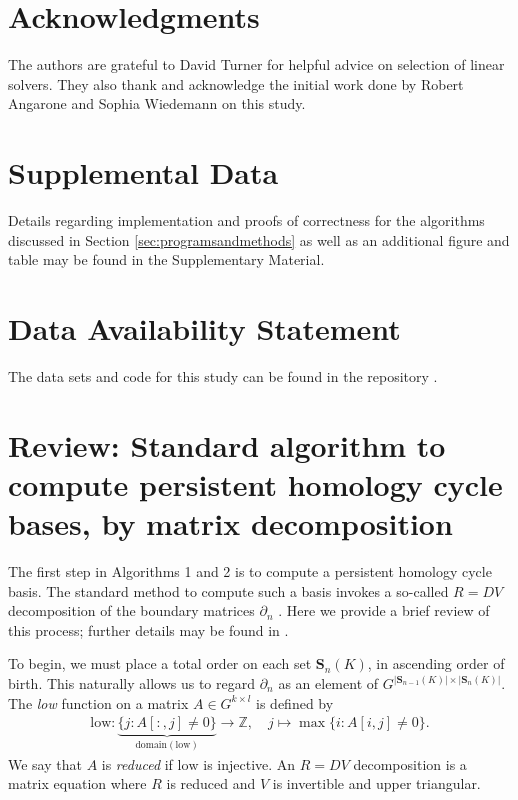\documentclass[11pt,onecolumn]{article}
\newcommand{\Z}{\mathbb{Z}}
\newcommand{\Simplices}[0]{\mathbf{S}}
\newcommand{\se}{Section }
\theoremstyle{plain}
\theoremstyle{definition}
\newcommand{\low}{\mathrm{low}}
\begin{document}
\section{Acknowledgments} 
The authors are grateful to David Turner for helpful advice on selection of linear solvers. They also thank and acknowledge the initial work done by Robert Angarone and Sophia Wiedemann on this study.

 
 \section{Supplemental Data}

Details regarding implementation and proofs of correctness for the algorithms discussed in \se \ref{sec:programsandmethods} as well as an additional figure and table may be found in the Supplementary Material.
 
\section{Data Availability Statement}
The data sets and code for this study can be found in the repository \cite{li_thompson}.

{\small
	

}

\newpage

\appendix

\onecolumn


\maketitle


\section{Review: Standard algorithm to compute persistent homology cycle bases, by matrix decomposition}
\label{sec:computingcyclereps}

The first step in Algorithms 1 and 2 is to compute a persistent homology cycle basis.  The standard method to compute such a basis invokes a so-called $R = DV$ decomposition  of the boundary matrices $\partial_n$ \cite{cohen2006vines}.  Here we  provide a brief review of this process; further details may be found in \cite{cohen2006vines, SMVDualities11}.
  
  To begin, we must place a total order on each set $\Simplices_n(K)$, in ascending order of birth.  This naturally allows us to regard $\partial_n$ as an element of $G^{|\Simplices_{n-1}(K)| \times |\Simplices_{n}(K)|}$.  The \emph{low}  function on a matrix $A \in G^{k \times l}$ is defined by
    \begin{align*}
        \low: \underbrace{\{j : A[:,j] \neq 0 \}}_{\mathrm{domain}(\low)} \to \Z, \quad j \mapsto \max \{i : A[i,j] \neq 0 \}.
    \end{align*}
We say that $A$ is \emph{reduced} if $\low$ is injective.  An $R = DV$ decomposition is a matrix equation where $R$ is reduced and $V$ is invertible and upper triangular.
\end{document}
